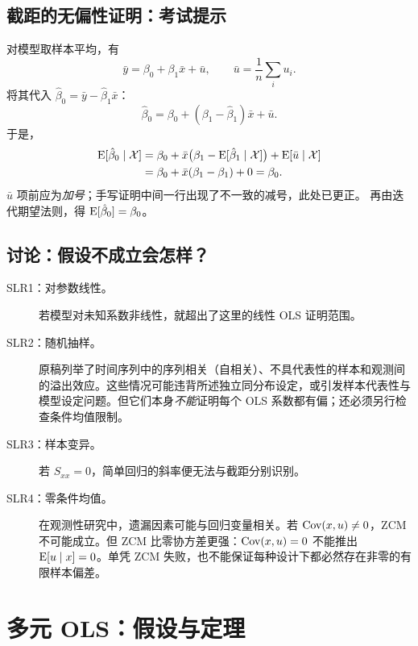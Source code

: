 \subsection{截距的无偏性证明：考试提示}
\label{sec:intercept-proof}
对模型取样本平均，有
\[\bar y=\beta_0+\beta_1\bar x+\bar u,\qquad
\bar u=\frac1n\sum_i u_i.\]
将其代入 $\hat\beta_0=\bar y-\hat\beta_1\bar x$：
\[\hat\beta_0=\beta_0+(\beta_1-\hat\beta_1)\bar x+\bar u.\]
于是，
\begin{align*}
\operatorname{E}[\hat\beta_0\mid\mathcal X]
&=\beta_0+\bar x\bigl(\beta_1-\operatorname{E}[\hat\beta_1\mid\mathcal X]\bigr)
+\operatorname{E}[\bar u\mid\mathcal X]\\
&=\beta_0+\bar x(\beta_1-\beta_1)+0=\beta_0.
\end{align*}
$\bar u$ 项前应为\emph{加号}；手写证明中间一行出现了不一致的减号，此处已更正。
再由迭代期望法则，得 $\operatorname{E}[\hat\beta_0]=\beta_0$。

\subsection{讨论：假设不成立会怎样？}
\begin{description}
\item[SLR1：对参数线性。]若模型对未知系数非线性，就超出了这里的线性 OLS 证明范围。
\item[SLR2：随机抽样。]原稿列举了时间序列中的序列相关（自相关）、不具代表性的样本和观测间的溢出效应。这些情况可能违背所述独立同分布设定，或引发样本代表性与模型设定问题。但它们本身\emph{不能}证明每个 OLS 系数都有偏；还必须另行检查条件均值限制。
\item[SLR3：样本变异。]若 $S_{xx}=0$，简单回归的斜率便无法与截距分别识别。
\item[SLR4：零条件均值。]在观测性研究中，遗漏因素可能与回归变量相关。若 $\operatorname{Cov}(x,u)\ne0$，ZCM 不可能成立。但 ZCM 比零协方差更强：$\operatorname{Cov}(x,u)=0$ 不能推出 $\operatorname{E}[u\mid x]=0$。单凭 ZCM 失败，也不能保证每种设计下都必然存在非零的有限样本偏差。
\end{description}

\section{多元 OLS：假设与定理}
\label{sec:multiple-unbiased}
